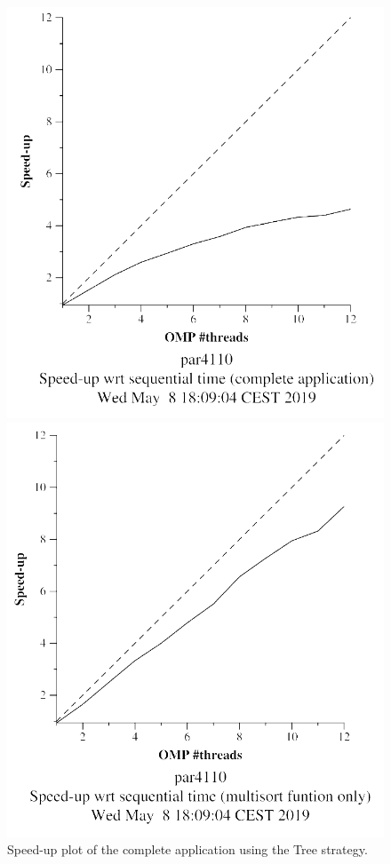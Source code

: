 \documentclass[12pt, a4paper]{article}
\begin{document}
\begin{figure}[H]
\centering
\begin{minipage}[b]{0.4\linewidth}
  \centering
  \includegraphics[scale=0.5]{./S2/S2_strong_scalability/multisort-omp-strong_boada-3_tree_complete_application}
  \caption{Speed-up plot of the complete application using the Tree strategy.}
  \label{fig:mandel-omp-10000-strong-21-time}
\end{minipage}%
\hspace{0.5cm}
\begin{minipage}[b]{0.4\linewidth}
  \centering
  \includegraphics[scale=0.5]{./S2/S2_strong_scalability/multisort-omp-strong_boada-3_tree_multisort_only}

\end{minipage}
\end{figure}
\end{document}
